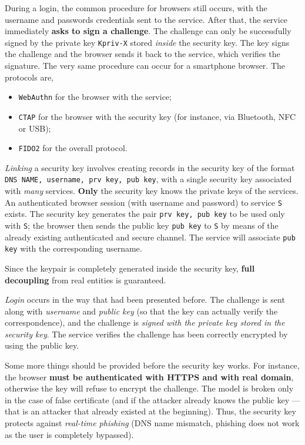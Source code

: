 \documentclass[10pt]{extreport}
\begin{document}
During a login, the common procedure for browsers still occurs, with the
username and passwords credentials sent to the service. After that, the service
immediately \textbf{asks to sign a challenge}. The challenge can only be
successfully signed by the private key \texttt{Kpriv-X} stored \emph{inside}
the security key. The key signs the challenge and the browser sends it back to
the service, which verifies the signature. The very same procedure can occur
for a smartphone browser. The protocols are, 
\begin{itemize}
    \item \texttt{WebAuthn} for the browser with the service;
    \item \texttt{CTAP} for the browser with the security key (for instance,
        via Bluetooth, NFC or USB);
    \item \texttt{FIDO2} for the overall protocol.
\end{itemize}

\emph{Linking} a security key involves creating records in the security key of
the format \texttt{DNS NAME, username, prv key, pub key}, with a single
security key associated with \emph{many} services. \textbf{Only} the security
key knows the private keys of the services. An authenticated browser session
(with username and password) to service \texttt{S} exists. The security key
generates the pair \texttt{prv key, pub key} to be used only with \texttt{S};
the browser then sends the public key \texttt{pub key} to \texttt{S} by means
of the already existing authenticated and secure channel. The service will
associate \texttt{pub key} with the corresponding username.

Since the keypair is completely generated inside the security key, \textbf{full
decoupling} from real entities is guaranteed.

\emph{Login} occurs in the way that had been presented before. The challenge is
sent along with \emph{username} and \emph{public key} (so that the key can
actually verify the correspondence), and the challenge is \emph{signed with the
private key stored in the security key}. The service verifies the challenge has
been correctly encrypted by using the public key.

Some more things should be provided before the security key works. For
instance, the browser \textbf{must be authenticated with HTTPS and with real
domain}, otherwise the key will refuse to encrypt the challenge. The model is
broken only in the case of false certificate (and if the attacker already knows
the public key --- that is an attacker that already existed at the beginning).
Thus, the security key protects against \emph{real\--time phishing} (DNS name
mismatch, phishing does not work as the user is completely bypassed).
\end{document}
